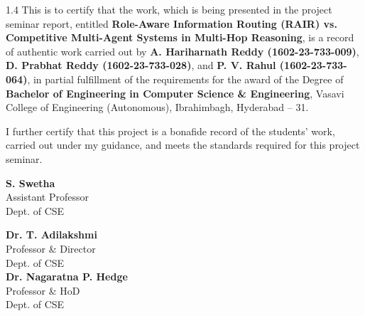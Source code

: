 \documentclass[12pt,a4paper]{report}
\begin{document}
\vspace{0.4cm}
\begin{spacing}{1.4}
\noindent This is to certify that the work, which is being presented in the project seminar report, entitled \textbf{Role-Aware Information Routing (RAIR) vs. Competitive Multi-Agent Systems in Multi-Hop Reasoning}, is a record of authentic work carried out by \textbf{A. Hariharnath Reddy (1602-23-733-009)}, \textbf{D. Prabhat Reddy (1602-23-733-028)}, and \textbf{P. V. Rahul (1602-23-733-064)}, in partial fulfillment of the requirements for the award of the Degree of \textbf{Bachelor of Engineering in Computer Science \& Engineering}, Vasavi College of Engineering (Autonomous), Ibrahimbagh, Hyderabad -- 31.

\vspace{0.35cm}
\noindent I further certify that this project is a bonafide record of the students' work, carried out under my guidance, and meets the standards required for this project seminar.
\end{spacing}

\vspace{1.8cm}
\noindent
\begin{minipage}[b]{0.45\textwidth}
  \textbf{S. Swetha}\\[3pt]
  Assistant Professor\\
  Dept. of CSE
\end{minipage}
\hfill
\begin{minipage}[b]{0.50\textwidth}
  \raggedleft
  \textbf{Dr. T. Adilakshmi}\\[3pt]
  Professor \& Director\\
  Dept. of CSE\\[1.5cm]
  \textbf{Dr. Nagaratna P. Hedge}\\[3pt]
  Professor \& HoD\\
  Dept. of CSE
\end{minipage}

\clearpage
\end{document}
